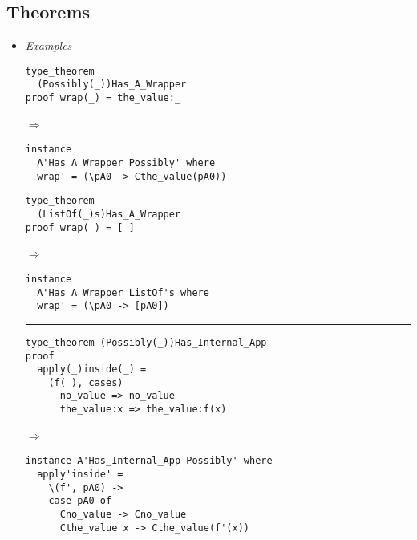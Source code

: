 \documentclass[diploma]{softlab-thesis}
\def\lra{$\Longrightarrow$\ }
\begin{document}
\newpage
\subsection{Theorems}

\begin{itemize}

\item
\textit{Examples}\\

\begin{minipage}{0.45\linewidth}

\begin{verbatim}
type_theorem
  (Possibly(_))Has_A_Wrapper
proof wrap(_) = the_value:_
\end{verbatim}

\lra

\begin{verbatim}
instance
  A'Has_A_Wrapper Possibly' where
  wrap' = (\pA0 -> Cthe_value(pA0))

\end{verbatim}

\end{minipage}
\hfill\vline\hfill
\begin{minipage}{0.50\linewidth}

\begin{verbatim}
type_theorem
  (ListOf(_)s)Has_A_Wrapper
proof wrap(_) = [_]
\end{verbatim}

\lra

\begin{verbatim}
instance
  A'Has_A_Wrapper ListOf's where
  wrap' = (\pA0 -> [pA0])

\end{verbatim}

\end{minipage}

\rule{\linewidth}{0.1pt}

\begin{verbatim}
type_theorem (Possibly(_))Has_Internal_App
proof
  apply(_)inside(_) =
    (f(_), cases)
      no_value => no_value
      the_value:x => the_value:f(x)
\end{verbatim}

\lra

\begin{verbatim}
instance A'Has_Internal_App Possibly' where
  apply'inside' =
    \(f', pA0) ->
    case pA0 of
      Cno_value -> Cno_value
      Cthe_value x -> Cthe_value(f'(x))
\end{verbatim}



\end{itemize}
\end{document}
